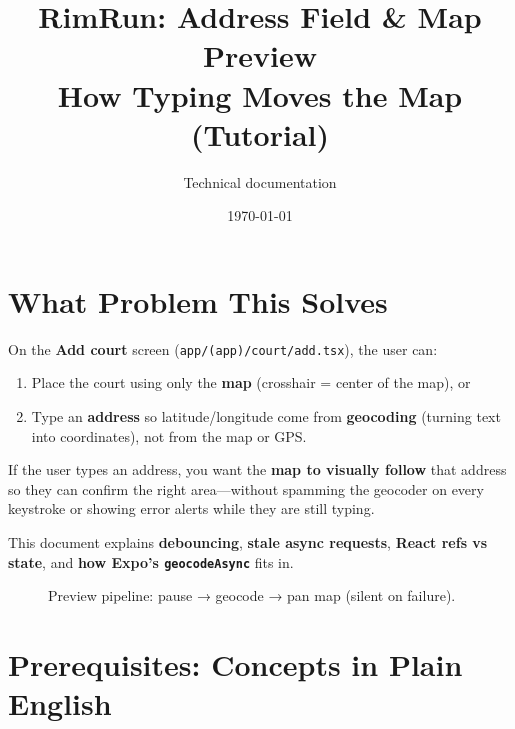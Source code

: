 \documentclass[11pt,a4paper]{article}
\title{\textbf{RimRun: Address Field \& Map Preview} \\ \large How Typing Moves the Map (Tutorial)}
\author{Technical documentation}
\date{\today}
\begin{document}
\maketitle
\tableofcontents
\newpage

\section{What Problem This Solves}

On the \textbf{Add court} screen (\texttt{app/(app)/court/add.tsx}), the user can:
\begin{enumerate}[noitemsep]
    \item Place the court using only the \textbf{map} (crosshair = center of the map), or
    \item Type an \textbf{address} so latitude/longitude come from \textbf{geocoding} (turning text into coordinates), not from the map or GPS.
\end{enumerate}

If the user types an address, you want the \textbf{map to visually follow} that address so they can confirm the right area---without spamming the geocoder on every keystroke or showing error alerts while they are still typing.

This document explains \textbf{debouncing}, \textbf{stale async requests}, \textbf{React refs vs state}, and \textbf{how Expo's \texttt{geocodeAsync}} fits in.

\begin{figure}[h]
\centering
{}
\caption{Preview pipeline: pause → geocode → pan map (silent on failure).}
\end{figure}

\section{Prerequisites: Concepts in Plain English}
\end{document}
